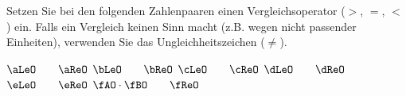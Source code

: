 Setzen Sie bei den folgenden Zahlenpaaren einen Vergleichsoperator ($>$, $=$, $<$) ein. Falls ein Vergleich keinen Sinn macht (z.B. wegen nicht passender Einheiten), verwenden Sie das Ungleichheitszeichen ($\neq$).

\begin{abcliste}
\abc $\aLeO \qquad \aReO$
\abc $\bLeO \qquad \bReO$
\abc $\cLeO \qquad \cReO$
\abc $\dLeO \qquad \dReO$
\abc $\eLeO \qquad \eReO$
\abc $\fAO\cdot\fBO \qquad \fReO$
\end{abcliste}

